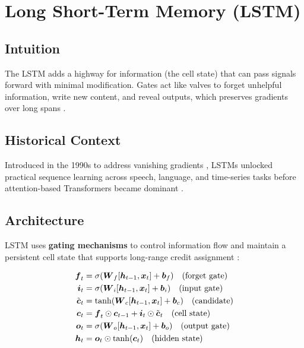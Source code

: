 
\section{Long Short-Term Memory (LSTM)}
\label{sec:lstm}

\subsection*{Intuition}

The LSTM adds a highway for information (the cell state) that can pass signals forward with minimal modification. Gates act like valves to forget unhelpful information, write new content, and reveal outputs, which preserves gradients over long spans \cite{Hochreiter1997,GoodfellowEtAl2016}.

\subsection*{Historical Context}

Introduced in the 1990s to address vanishing gradients \cite{Hochreiter1997}, LSTMs unlocked practical sequence learning across speech, language, and time-series tasks before attention-based Transformers became dominant \cite{Vaswani2017}.


\subsection{Architecture}

LSTM uses \textbf{gating mechanisms} to control information flow and maintain a persistent cell state that supports long-range credit assignment \cite{Hochreiter1997,GoodfellowEtAl2016}:

\begin{align}
\boldsymbol{f}_t &= \sigma(\boldsymbol{W}_f [\boldsymbol{h}_{t-1}, \boldsymbol{x}_t] + \boldsymbol{b}_f) \quad \text{(forget gate)} \\
\boldsymbol{i}_t &= \sigma(\boldsymbol{W}_i [\boldsymbol{h}_{t-1}, \boldsymbol{x}_t] + \boldsymbol{b}_i) \quad \text{(input gate)} \\
\tilde{\boldsymbol{c}}_t &= \tanh(\boldsymbol{W}_c [\boldsymbol{h}_{t-1}, \boldsymbol{x}_t] + \boldsymbol{b}_c) \quad \text{(candidate)} \\
\boldsymbol{c}_t &= \boldsymbol{f}_t \odot \boldsymbol{c}_{t-1} + \boldsymbol{i}_t \odot \tilde{\boldsymbol{c}}_t \quad \text{(cell state)} \\
\boldsymbol{o}_t &= \sigma(\boldsymbol{W}_o [\boldsymbol{h}_{t-1}, \boldsymbol{x}_t] + \boldsymbol{b}_o) \quad \text{(output gate)} \\
\boldsymbol{h}_t &= \boldsymbol{o}_t \odot \tanh(\boldsymbol{c}_t) \quad \text{(hidden state)}
\end{align}

